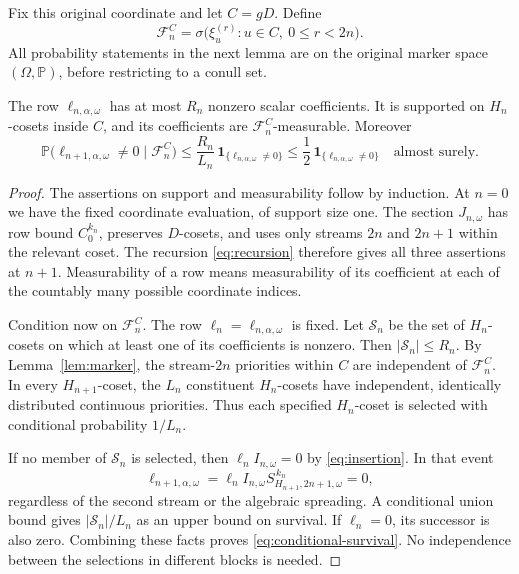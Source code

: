 \documentclass[11pt,a4paper]{article}
\numberwithin{equation}{section}
\newcommand{\Prob}{\mathbb P}
\newcommand{\cF}{\mathcal F}
\begin{document}
Fix this original coordinate and let $C=gD$. Define
\begin{equation}\label{eq:filtration}
 \cF_n^C=\sigma\bigl(\xi_u^{(r)}:
                          u\in C,\ 0\leq r<2n\bigr).
\end{equation}
All probability statements in the next lemma are on the original
marker space $(\Omega,\Prob)$, before restricting to a conull set.

\begin{lemma}\label{lem:recovery}
The row $\ell_{n,\alpha,\omega}$ has at most $R_n$ nonzero scalar
coefficients. It is supported on $H_n$-cosets inside $C$, and its
coefficients are $\cF_n^C$-measurable. Moreover
\begin{equation}\label{eq:conditional-survival}
 \Prob\bigl(\ell_{n+1,\alpha,\omega}\ne0\mid\cF_n^C\bigr)
 \leq \frac{R_n}{L_n}\,
              \mathbf1_{\{\ell_{n,\alpha,\omega}\ne0\}}
 \leq \frac12\,
              \mathbf1_{\{\ell_{n,\alpha,\omega}\ne0\}}
 \quad\text{almost surely}.
\end{equation}
\end{lemma}
\begin{proof}
The assertions on support and measurability follow by induction.
At $n=0$ we have the fixed coordinate evaluation, of support size one.
The section $J_{n,\omega}$ has row bound $C_0^{k_n}$, preserves
$D$-cosets, and uses only streams $2n$ and $2n+1$ within the relevant
coset. The recursion \eqref{eq:recursion} therefore gives all three
assertions at $n+1$. Measurability of a row means measurability of its
coefficient at each of the countably many possible coordinate indices.

Condition now on $\cF_n^C$. The row $\ell_n=\ell_{n,\alpha,\omega}$
is fixed. Let $\mathcal S_n$ be the set of $H_n$-cosets on which at
least one of its coefficients is nonzero. Then
$|\mathcal S_n|\leq R_n$. By Lemma~\ref{lem:marker}, the stream-$2n$
priorities within $C$ are independent of $\cF_n^C$. In every
$H_{n+1}$-coset, the $L_n$ constituent $H_n$-cosets have independent,
identically distributed continuous priorities. Thus each specified
$H_n$-coset is selected with conditional probability $1/L_n$.

If no member of $\mathcal S_n$ is selected, then
$\ell_n I_{n,\omega}=0$ by \eqref{eq:insertion}. In that event
\[
 \ell_{n+1,\alpha,\omega}
   =\ell_n I_{n,\omega}
          S_{H_{n+1},2n+1,\omega}^{\,k_n}=0,
\]
regardless of the second stream or the algebraic spreading. A
conditional union bound gives $|\mathcal S_n|/L_n$ as an upper bound
on survival. If $\ell_n=0$, its successor is also zero. Combining these
facts proves \eqref{eq:conditional-survival}. No independence between
the selections in different blocks is needed.
\end{proof}
\end{document}
